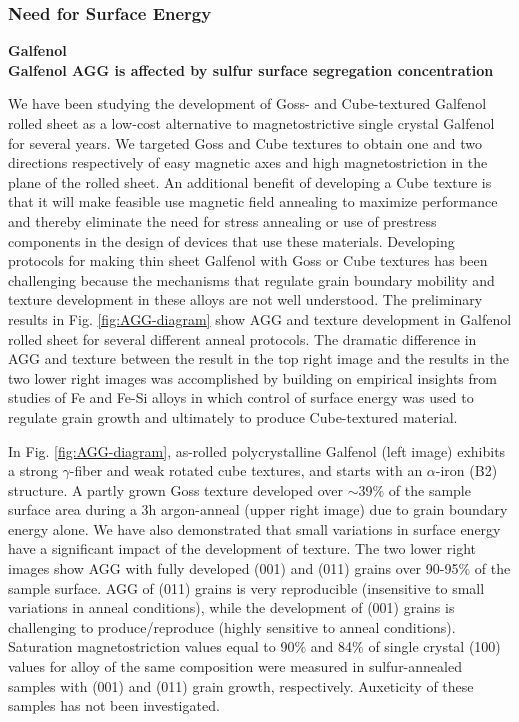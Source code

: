 
\subsubsection{Need for Surface Energy}

\textbf{Galfenol} \\
\textbf{Galfenol AGG is affected by sulfur surface segregation concentration}

We have been studying the development of Goss- and Cube-textured Galfenol rolled sheet as a low-cost alternative to magnetostrictive single crystal Galfenol for several years. We targeted Goss and Cube textures to obtain one and two directions respectively of easy magnetic axes and high magnetostriction in the plane of the rolled sheet. An additional benefit of developing a Cube texture is that it will make feasible use magnetic field annealing to maximize performance\cite{Yoo2008,Yoo2009} and thereby eliminate the need for stress annealing or use of prestress components in the design of devices that use these materials.\cite{Restorff2006,Summers2009b} Developing protocols for making thin sheet Galfenol with Goss or Cube textures has been challenging because the mechanisms that regulate grain boundary mobility and texture development in these alloys are not well understood. The preliminary results in Fig. \ref{fig:AGG-diagram} show AGG and texture development in Galfenol rolled sheet for several different anneal protocols. The dramatic difference in AGG and texture between the result in the top right image and the results in the two lower right images was accomplished by building on empirical insights from studies of Fe and Fe-Si alloys in which control of surface energy was used to regulate grain growth and ultimately to produce Cube-textured material.\cite{Walter1965,dunn1962surface,waeckerle1993effect,Kramer1992}

In Fig. \ref{fig:AGG-diagram}, as-rolled polycrystalline Galfenol (left image) exhibits a strong $\gamma$-fiber and weak rotated cube textures, and starts with an $\alpha$-iron (B2) structure. A partly grown Goss texture developed over $\sim$39$\%$ of the sample surface area during a 3h argon-anneal (upper right image) due to grain boundary energy alone. We have also demonstrated that small variations in surface energy have a significant impact of the development of texture.\cite{Chun2010,Na2012b} The two lower right images show AGG with fully developed \hkl(001) and \hkl(011) grains over 90-95$ \% $ of the sample surface. AGG of (011) grains is very reproducible (insensitive to small variations in anneal conditions), while the development of (001) grains is challenging to produce/reproduce (highly sensitive to anneal conditions). Saturation magnetostriction values equal to 90$ \% $ and 84$ \% $ of single crystal \hkl(100) values for alloy of the same composition were measured in sulfur-annealed samples with \hkl(001) and \hkl(011) grain growth, respectively. Auxeticity of these samples has not been investigated. 

